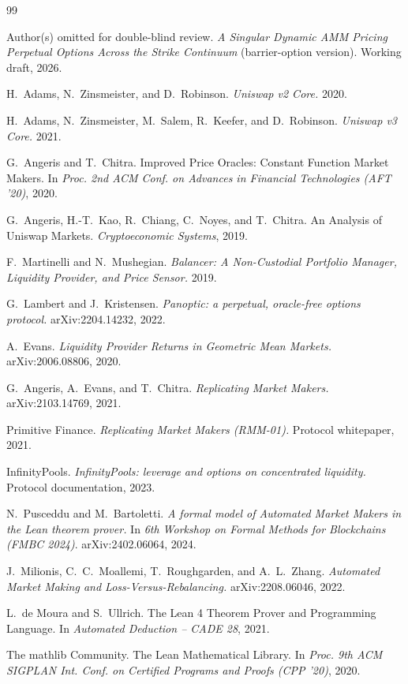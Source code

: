 \documentclass[runningheads]{llncs}
\begin{document}
\begin{thebibliography}{99}

Author(s) omitted for double-blind review.
\emph{A Singular Dynamic AMM Pricing Perpetual Options Across the Strike
Continuum} (barrier-option version). Working draft, 2026.

H.~Adams, N.~Zinsmeister, and D.~Robinson.
\emph{Uniswap v2 Core.} 2020.

H.~Adams, N.~Zinsmeister, M.~Salem, R.~Keefer, and D.~Robinson.
\emph{Uniswap v3 Core.} 2021.

G.~Angeris and T.~Chitra.
Improved Price Oracles: Constant Function Market Makers.
In \emph{Proc. 2nd ACM Conf. on Advances in Financial Technologies (AFT '20)},
2020.

G.~Angeris, H.-T.~Kao, R.~Chiang, C.~Noyes, and T.~Chitra.
An Analysis of Uniswap Markets.
\emph{Cryptoeconomic Systems}, 2019.

F.~Martinelli and N.~Mushegian.
\emph{Balancer: A Non-Custodial Portfolio Manager, Liquidity Provider, and Price
Sensor.} 2019.

G.~Lambert and J.~Kristensen.
\emph{Panoptic: a perpetual, oracle-free options protocol.}
arXiv:2204.14232, 2022.

A.~Evans.
\emph{Liquidity Provider Returns in Geometric Mean Markets.}
arXiv:2006.08806, 2020.

G.~Angeris, A.~Evans, and T.~Chitra.
\emph{Replicating Market Makers.}
arXiv:2103.14769, 2021.

Primitive Finance.
\emph{Replicating Market Makers (RMM-01).}
Protocol whitepaper, 2021.

InfinityPools.
\emph{InfinityPools: leverage and options on concentrated liquidity.}
Protocol documentation, 2023.

N.~Pusceddu and M.~Bartoletti.
\emph{A formal model of Automated Market Makers in the Lean theorem prover.}
In \emph{6th Workshop on Formal Methods for Blockchains (FMBC 2024)}.
arXiv:2402.06064, 2024.

J.~Milionis, C.~C.~Moallemi, T.~Roughgarden, and A.~L.~Zhang.
\emph{Automated Market Making and Loss-Versus-Rebalancing.}
arXiv:2208.06046, 2022.

L.~de Moura and S.~Ullrich.
The Lean 4 Theorem Prover and Programming Language.
In \emph{Automated Deduction -- CADE 28}, 2021.

The mathlib Community.
The Lean Mathematical Library.
In \emph{Proc. 9th ACM SIGPLAN Int. Conf. on Certified Programs and Proofs
(CPP '20)}, 2020.

\end{thebibliography}
\end{document}

